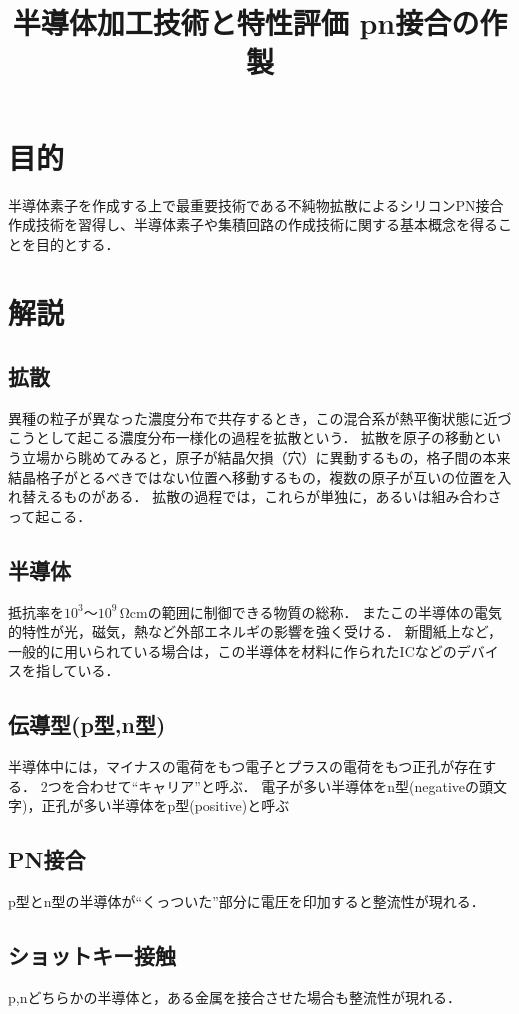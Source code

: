 \documentclass[11pt]{jarticle}
\title{半導体加工技術と特性評価 pn接合の作製}
\begin{document}
\maketitle

\section{目的}
半導体素子を作成する上で最重要技術である不純物拡散によるシリコンPN接合作成技術を習得し、半導体素子や集積回路の作成技術に関する基本概念を得ることを目的とする．
\section{解説}
	\subsection{拡散}
		異種の粒子が異なった濃度分布で共存するとき，この混合系が熱平衡状態に近づこうとして起こる濃度分布一様化の過程を拡散という．
		拡散を原子の移動という立場から眺めてみると，原子が結晶欠損（穴）に異動するもの，格子間の本来結晶格子がとるべきではない位置へ移動するもの，複数の原子が互いの位置を入れ替えるものがある．
		拡散の過程では，これらが単独に，あるいは組み合わさって起こる．
	\subsection{半導体}
		抵抗率を$10^3～10^9\,\mathrm{\Omega cm}$の範囲に制御できる物質の総称．
		またこの半導体の電気的特性が光，磁気，熱など外部エネルギの影響を強く受ける．
		新聞紙上など，一般的に用いられている場合は，この半導体を材料に作られたICなどのデバイスを指している．
	\subsection{伝導型(p型,n型)}
		半導体中には，マイナスの電荷をもつ電子とプラスの電荷をもつ正孔が存在する．
		2つを合わせて``キャリア''と呼ぶ．
		電子が多い半導体をn型(negativeの頭文字)，正孔が多い半導体をp型(positive)と呼ぶ
	\subsection{PN接合}
		p型とn型の半導体が``くっついた''部分に電圧を印加すると整流性が現れる．
	\subsection{ショットキー接触}
		p,nどちらかの半導体と，ある金属を接合させた場合も整流性が現れる．
\end{document}

